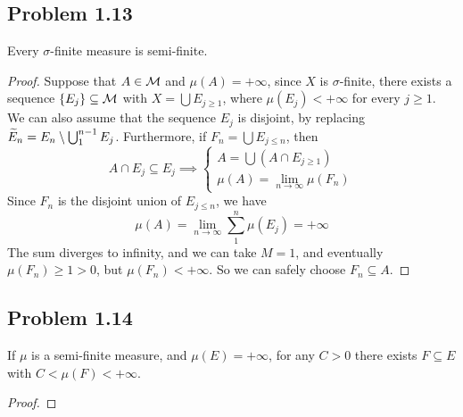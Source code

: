 \documentclass[../../main.tex]{subfiles}
\begin{document}
\subsection*{Problem 1.13}
\begin{wts}
Every $\sigma$-finite measure is semi-finite.
\end{wts}
\begin{proof}
    Suppose that $A\in\mathcal{M}$ and $\mu(A)=+\infty$, since $X$ is $\sigma$-finite, there exists a sequence $\{E_j\}\subseteq\mathcal{M}$ with $X=\bigcup E_{j\geq 1}$, where $\mu(E_j)<+\infty$ for every $j\geq 1$. We can also assume that the sequence $E_j$ is disjoint, by replacing $\widetilde{E}_n=E_n\setminus \bigcup^{n-1}_{1}E_j$. Furthermore, if $F_n=\bigcup E_{j\leq n}$, then
    \[
    A\cap E_j\subseteq E_j\implies \begin{cases}A=\bigcup (A\cap E_{j\geq 1})\\ \mu(A)=\lim_{n\to\infty} \mu(F_n)\end{cases}
    \]
    Since $F_n$ is the disjoint union of $E_{j\leq n}$, we have
    \[
    \mu(A)=\lim_{n\to\infty}\sum^n_1 \mu(E_j)=+\infty
    \]
    The sum diverges to infinity, and we can take $M=1$, and eventually $\mu(F_n)\geq 1>0$, but $\mu(F_n)<+\infty$. So we can safely choose $F_n\subseteq A$.
\end{proof}

\subsection{Problem 1.14}
\begin{wts}
    If $\mu$ is a semi-finite measure, and $\mu(E)=+\infty$, for any $C>0$ there exists $F\subseteq E$ with $C<\mu(F)<+\infty$.
\end{wts}
\begin{proof}
    
\end{proof}
\end{document}
